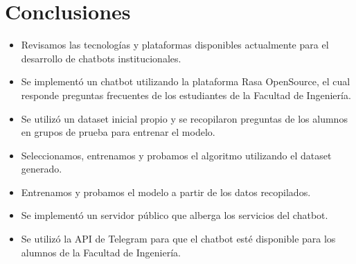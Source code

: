 \section[Conclusiones]{Conclusiones}
\begin{itemize}
	\item Revisamos las tecnologías y plataformas disponibles actualmente para el desarrollo de
	      chatbots institucionales.
	\item Se implementó un chatbot utilizando la plataforma Rasa OpenSource, el cual responde preguntas
	      frecuentes de los estudiantes de la Facultad de Ingeniería.
	\item Se utilizó un dataset inicial propio y se recopilaron preguntas de los alumnos en grupos de
	      prueba para entrenar el modelo.
	\item Seleccionamos, entrenamos y probamos el algoritmo utilizando el dataset generado.
	\item Entrenamos y probamos el modelo a partir de los datos recopilados.
	\item Se implementó un servidor público que alberga los servicios del chatbot.
	\item Se utilizó la API de Telegram para que el chatbot esté disponible para los alumnos de la
	      Facultad de Ingeniería.
\end{itemize}